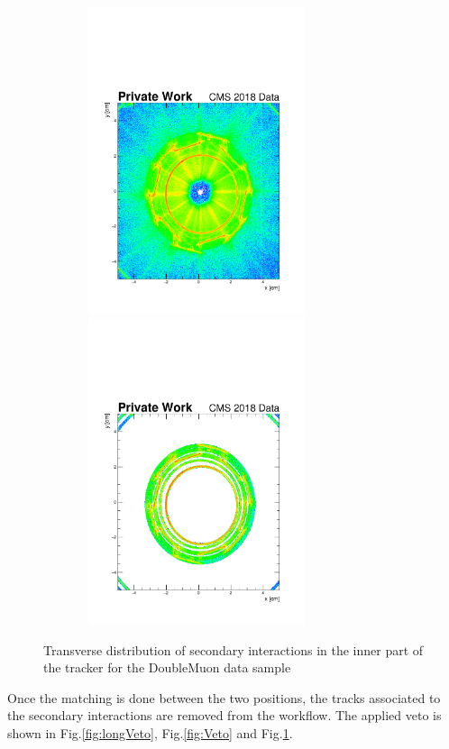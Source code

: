 \documentclass{cernatlasnote}
\begin{document}
\begin{figure}[ht]
\hspace{-1 cm}
\includegraphics[height=9cm, width=9cm, trim= 0cm 0cm 0cm 0.cm,clip]{images/SecInt/DoubleMuon_UL2018_MiniAODv2_GT36-v1_hData_reco_SecInt_xy_Inner_Selec.pdf}\includegraphics[height=9cm, width=9cm, trim= 0cm 0cm 0cm 0.cm,clip]{images/SecInt/DoubleMuon_UL2018_MiniAODv2_GT36-v1_hData_reco_SecInt_xy_Inner_TrackerMatched.pdf}
\caption{\label{fig:InnerVeto} Transverse distribution of secondary interactions in the inner part of the tracker for the DoubleMuon data sample}
\end{figure}
\FloatBarrier

Once the matching is done between the two positions, the tracks associated to the secondary interactions are removed from the workflow. The applied veto is shown in Fig.\ref{fig:longVeto}, Fig.\ref{fig:Veto} and  Fig.\ref{fig:InnerVeto}.
        
\end{document}
